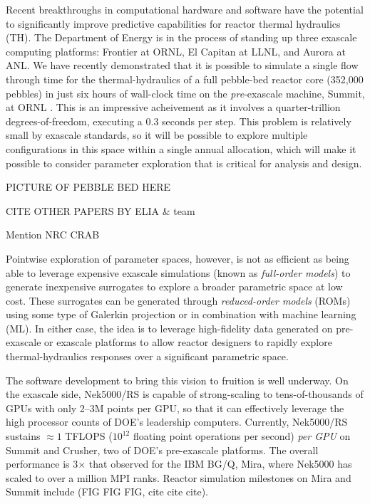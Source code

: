 Recent breakthroughs in computational hardware and software have the potential
to significantly improve predictive capabilities for reactor thermal hydraulics
(TH).  The Department of Energy is in the process of standing up three exascale
computing platforms: Frontier at ORNL, El Capitan at LLNL, and Aurora at ANL.
We have recently demonstrated that it is possible to simulate a single flow
through time for the thermal-hydraulics of a full pebble-bed reactor core
(352,000 pebbles) in just six hours of wall-clock time on the {\em
pre}-exascale machine, Summit, at ORNL \cite{sc22}.   This is an impressive
acheivement as it involves a quarter-trillion degrees-of-freedom, executing a
0.3 seconds per step.  This problem is relatively small by exascale standards,
so it will be possible to explore multiple configurations in this space within
a single annual allocation, which will make it possible to consider parameter
exploration that is critical for analysis and design.

PICTURE OF PEBBLE BED HERE

CITE OTHER PAPERS BY ELIA \& team

Mention NRC CRAB

Pointwise exploration of parameter spaces, however, is not as efficient as being
able to leverage expensive exascale simulations (known as {\em full-order
models}) to generate inexpensive surrogates to explore a broader parametric
space at low cost.    These surrogates can be generated through {\em reduced-order
models} (ROMs) using some type of Galerkin projection or in combination with
machine learning (ML).   In either case, the idea is to leverage high-fidelity
data generated on pre-exascale or exascale platforms to allow reactor designers
to rapidly explore thermal-hydraulics responses over a significant parametric
space.   

The software development to bring this vision to fruition is well underway.
On the exascale side, Nek5000/RS is capable of strong-scaling to tens-of-thousands
of GPUs with only 2--3M points per GPU, so that it can effectively leverage
the high processor counts of DOE's leadership computers.  Currently, Nek5000/RS
sustains $\approx 1$ TFLOPS ($10^{12}$ floating point operations per second)
{\em per GPU} on Summit and Crusher, two of DOE's pre-exascale platforms.
The overall performance is 3$\times$ that observed for the IBM BG/Q, Mira,
where Nek5000 has scaled to over a million MPI ranks.   Reactor simulation
milestones on Mira and Summit include (FIG FIG FIG, cite cite cite).

